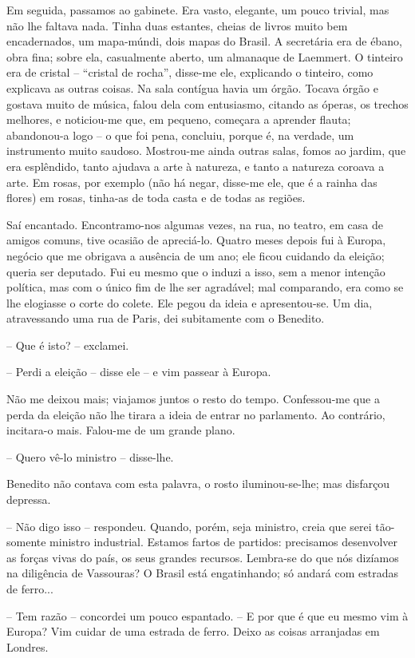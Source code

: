 Em seguida, passamos ao gabinete. Era vasto, elegante, um pouco trivial,
mas não lhe faltava nada. Tinha duas estantes, cheias de livros muito
bem encadernados, um mapa-múndi, dois mapas do Brasil. A secretária era
de ébano, obra fina; sobre ela, casualmente aberto, um almanaque de
Laemmert. O tinteiro era de cristal -- ``cristal de rocha'', disse-me
ele, explicando o tinteiro, como explicava as outras coisas. Na sala
contígua havia um órgão. Tocava órgão e gostava muito de música, falou
dela com entusiasmo, citando as óperas, os trechos melhores, e
noticiou-me que, em pequeno, começara a aprender flauta; abandonou-a
logo -- o que foi pena, concluiu, porque é, na verdade, um instrumento
muito saudoso. Mostrou-me ainda outras salas, fomos ao jardim, que era
esplêndido, tanto ajudava a arte à natureza, e tanto a natureza coroava
a arte. Em rosas, por exemplo (não há negar, disse-me ele, que é a
rainha das flores) em rosas, tinha-as de toda casta e de todas as
regiões.

Saí encantado. Encontramo-nos algumas vezes, na rua, no teatro, em casa
de amigos comuns, tive ocasião de apreciá-lo. Quatro meses depois fui à
Europa, negócio que me obrigava a ausência de um ano; ele ficou cuidando
da eleição; queria ser deputado. Fui eu mesmo que o induzi a isso, sem a
menor intenção política, mas com o único fim de lhe ser agradável; mal
comparando, era como se lhe elogiasse o corte do colete. Ele pegou da
ideia e apresentou-se. Um dia, atravessando uma rua de Paris, dei
subitamente com o Benedito.

-- Que é isto? -- exclamei.

-- Perdi a eleição -- disse ele -- e vim passear à Europa.

Não me deixou mais; viajamos juntos o resto do tempo. Confessou-me que a
perda da eleição não lhe tirara a ideia de entrar no parlamento. Ao
contrário, incitara-o mais. Falou-me de um grande plano.

-- Quero vê-lo ministro -- disse-lhe.

Benedito não contava com esta palavra, o rosto iluminou-se-lhe; mas
disfarçou depressa.

-- Não digo isso -- respondeu. Quando, porém, seja ministro, creia que
serei tão-somente ministro industrial. Estamos fartos de partidos:
precisamos desenvolver as forças vivas do país, os seus grandes
recursos. Lembra-se do que nós dizíamos na diligência de Vassouras? O
Brasil está engatinhando; só andará com estradas de ferro...

-- Tem razão -- concordei um pouco espantado. -- E por que é que eu
mesmo vim à Europa? Vim cuidar de uma estrada de ferro. Deixo as coisas
arranjadas em Londres.

